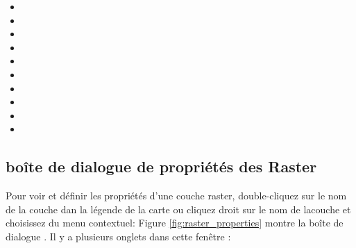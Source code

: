 \begin{itemize}
\item {}
\item {}
\item {}
\item {}
\item {}
\item {}
\item {}
\item {}
\item {}
\item {}
\end{itemize}

\subsection{boîte de dialogue de propriétés des Raster}\label{label_rasterprop}

Pour voir et définir les propriétés d'une couche raster, double-cliquez sur le
nom de la couche dan la légende de la carte ou cliquez droit sur le nom de
lacouche et choisissez  du menu
contextuel:  Figure
\ref{fig:raster_properties} montre la boîte de dialogue . Il y a plusieurs onglets dans cette fenêtre :

